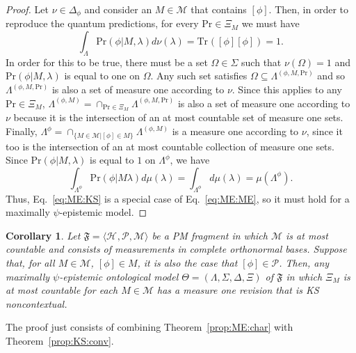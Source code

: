 \documentclass[DIV=calc,fontsize=12pt]{scrartcl} %
\theoremstyle{definition}
\theoremstyle{plain}
\newtheorem{corollary}[definition]{Corollary}
\newcommand{\Proj}[1]{\ensuremath{\left [ #1 \right ]}}
\newcommand{\Hilb}[1][]{\ensuremath{\mathcal{H}_{#1}}}
\newcommand{\Tr}[2][]{\ensuremath{\text{Tr}_{#1} \left ( #2 \right )}}
\begin{document}
\begin{proof}
Let $\nu \in \Delta_{\phi}$ and consider an $M \in \mathcal{M}$ that
contains $\Proj{\phi}$.  Then, in order to reproduce the quantum
predictions, for every $\text{Pr} \in \Xi_M$ we must have
\begin{equation}
\int_{\Lambda} \text{Pr}(\phi|M,\lambda) d\nu(\lambda) =
\Tr{\Proj{\phi}\Proj{\phi}} = 1.
\end{equation}
In order for this to be true, there must be a set $\Omega \in
\Sigma$ such that $\nu(\Omega) = 1$ and $\text{Pr}(\phi|M,\lambda)$
is equal to one on $\Omega$.  Any such set satisfies $\Omega
\subseteq \Lambda^{(\phi,M,\text{Pr})}$ and so
$\Lambda^{(\phi,M,\text{Pr})}$ is also a set of measure one
according to $\nu$.  Since this applies to any $\text{Pr} \in
\Xi_M$, $\Lambda^{(\phi,M)} = \cap_{\text{Pr} \in \Xi_M}
\Lambda^{(\phi,M,\text{Pr})}$ is also a set of measure one according
to $\nu$ because it is the intersection of an at most countable set
of measure one sets.  Finally, $\Lambda^{\phi} = \cap_{\{M \in
\mathcal{M}| \Proj{\phi} \in M\}} \Lambda^{(\phi,M)}$ is a measure
one according to $\nu$, since it too is the intersection of an at
most countable collection of measure one sets. Since
$\text{Pr}(\phi|M,\lambda)$ is equal to $1$ on $\Lambda^{\phi}$, we
have
\begin{equation}
\int_{\Lambda^{\phi}} \text{Pr}(\phi|M \lambda) d\mu(\lambda) =
\int_{\Lambda^{\phi}} d\mu(\lambda) = \mu(\Lambda^{\phi}).
\end{equation}
Thus, Eq.~\eqref{eq:ME:KS} is a special case of
Eq.~\eqref{eq:ME:ME}, so it must hold for a maximally
$\psi$-epistemic model.
\end{proof}

\begin{corollary}
\label{cor:ME:KS}
Let $\mathfrak{F} = \langle \Hilb, \mathcal{P}, \mathcal{M} \rangle$
be a PM fragment in which $\mathcal{M}$ is at most countable and
consists of measurements in complete orthonormal bases.  Suppose
that, for all $M \in \mathcal{M}$, $\Proj{\phi} \in M$, it is also
the case that $\Proj{\phi} \in \mathcal{P}$.  Then, any maximally
$\psi$-epistemic ontological model $\Theta =
(\Lambda,\Sigma,\Delta,\Xi)$ of $\mathfrak{F}$ in which $\Xi_M$ is
at most countable for each $M \in \mathcal{M}$ has a measure one
revision that is KS noncontextual.
\end{corollary}

The proof just consists of combining Theorem~\ref{prop:ME:char}
with Theorem~\ref{prop:KS:conv}.
\pagebreak
\balance
\end{document}
